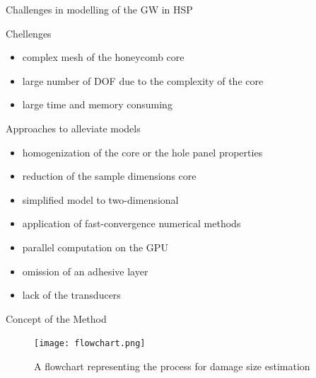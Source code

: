 \documentclass[10pt]{beamer} %
\begin{document}
\begin{frame}[label=frame4]{Challenges in modelling of the GW in HSP}
	\begin{alertblock}{Chellenges}
		\begin{itemize}
			\item complex mesh of the honeycomb core
			\item large number of DOF due to the complexity of the core
			\item large time and memory consuming
		\end{itemize}
	\end{alertblock}
	\begin{alertblock}{Approaches to alleviate models}
		\begin{itemize}
			\item homogenization of the core or the hole panel properties
			\item reduction of the sample dimensions core
			\item simplified model to two-dimensional
			\item application of fast-convergence numerical methods
			\item parallel computation on the GPU
			\item omission of an adhesive layer
			\item lack of the transducers
		\end{itemize}
	\end{alertblock}

\end{frame}
\begin{frame}[label=frame5]{Concept of the Method}
	\begin{figure}
		\texttt{[image: flowchart.png]}
		\caption{A flowchart representing the process for damage size estimation}
	\end{figure}
\end{frame}
\end{document}
